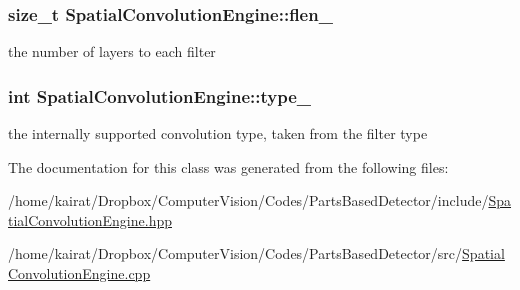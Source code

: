 \subsubsection[{flen\+\_\+}]{\setlength{\rightskip}{0pt plus 5cm}size\+\_\+t Spatial\+Convolution\+Engine\+::flen\+\_\+\hspace{0.3cm}{\ttfamily [private]}}\label{classSpatialConvolutionEngine_a5d58b30ec6846ef7ccf98f980d4fc957}


the number of layers to each filter 

\hypertarget{classSpatialConvolutionEngine_a913adab567840b6d1b2407c3b22ca108}{}
\subsubsection[{type\+\_\+}]{\setlength{\rightskip}{0pt plus 5cm}int Spatial\+Convolution\+Engine\+::type\+\_\+\hspace{0.3cm}{\ttfamily [private]}}\label{classSpatialConvolutionEngine_a913adab567840b6d1b2407c3b22ca108}


the internally supported convolution type, taken from the filter type 



The documentation for this class was generated from the following files\+:\begin{DoxyCompactItemize}
\item 
/home/kairat/\+Dropbox/\+Computer\+Vision/\+Codes/\+Parts\+Based\+Detector/include/\hyperlink{SpatialConvolutionEngine_8hpp}{Spatial\+Convolution\+Engine.\+hpp}\item 
/home/kairat/\+Dropbox/\+Computer\+Vision/\+Codes/\+Parts\+Based\+Detector/src/\hyperlink{SpatialConvolutionEngine_8cpp}{Spatial\+Convolution\+Engine.\+cpp}\end{DoxyCompactItemize}

